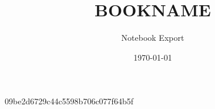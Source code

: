 \documentclass[a4paper,11pt]{report}
\title{BOOKNAME}
\author{Notebook Export}
\date{\today}
\begin{document}
\begin{titlepage}
    \maketitle
\end{titlepage}

\tableofcontents\clearpage

09be2d6729c44c5598b706c077f64b5f
\end{document}
